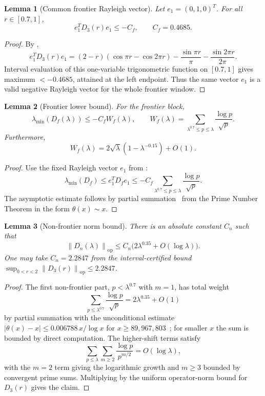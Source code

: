 \documentclass[11pt,a4paper]{article}
\newtheorem{lemma}[lemma]{Lemma}
\theoremstyle{remark}
\theoremstyle{plain}
\newcommand{\norm}[1]{\left\lVert #1 \right\rVert}
\begin{document}
\begin{lemma}[Common frontier Rayleigh vector]
\label{lem:common-vector}
Let $e_1=(0,1,0)^T$. For all $r\in[0.7,1]$,
\[
  e_1^T D_3(r)e_1\leq -C_f,
  \qquad C_f=0.4685.
\]
\end{lemma}

\begin{proof}
By ,
\[
  e_1^T D_3(r)e_1
  =(2-r)(\cos\pi r-\cos2\pi r)
  -\frac{\sin\pi r}{\pi}
  -\frac{\sin2\pi r}{2\pi}.
\]
Interval evaluation of this one-variable trigonometric function on $[0.7,1]$
gives maximum $<-0.4685$, attained at the left endpoint. Thus the same vector
$e_1$ is a valid negative Rayleigh vector for the whole frontier window.
\end{proof}

\begin{lemma}[Frontier lower bound]
\label{lem:frontier}
For the frontier block,
\[
  \lambda_{\min}(D_f(\lambda))
  \leq
  -C_f W_f(\lambda),
  \qquad
  W_f(\lambda)=
  \sum_{\lambda^{0.7}\leq p\leq\lambda}\frac{\log p}{\sqrt p}.
\]
Furthermore,
\[
  W_f(\lambda)=2\sqrt\lambda(1-\lambda^{-0.15})+O(1).
\]
\end{lemma}

\begin{proof}
Use the fixed Rayleigh vector $e_1$ from :
\[
  \lambda_{\min}(D_f)
  \leq e_1^T D_f e_1
  \leq -C_f\sum_{\lambda^{0.7}\leq p\leq\lambda}\frac{\log p}{\sqrt p}.
\]
The asymptotic estimate follows by partial summation~\cite{IwaniecKowalski2004}
from the Prime Number Theorem in the form $\theta(x)\sim x$.
\end{proof}

\begin{lemma}[Non-frontier norm bound]
\label{lem:nonfrontier}
There is an absolute constant $C_n$ such that
\[
  \norm{D_n(\lambda)}_{\mathrm{op}}
  \leq C_n\bigl(2\lambda^{0.35}+O(\log\lambda)\bigr).
\]
One may take $C_n=2.2847$ from the interval-certified bound
$\sup_{0<r<2}\norm{D_3(r)}_{\mathrm{op}}\leq2.2847$.
\end{lemma}

\begin{proof}
The first non-frontier part, $p<\lambda^{0.7}$ with $m=1$, has total weight
\[
  \sum_{p\leq\lambda^{0.7}}\frac{\log p}{\sqrt p}
  =2\lambda^{0.35}+O(1)
\]
by partial summation with the unconditional estimate
$|\theta(x)-x|\leq 0.006788\,x/\log x$ for $x\geq 89{,}967{,}803$~\cite{Dusart2010};
for smaller $x$ the sum is bounded by direct computation.
The higher-shift terms satisfy
\[
  \sum_{p\leq\lambda}\sum_{m\geq2}\frac{\log p}{p^{m/2}}
  =O(\log\lambda),
\]
with the $m=2$ term giving the logarithmic growth and $m\geq3$ bounded by
convergent prime sums. Multiplying by the uniform operator-norm bound for
$D_3(r)$ gives the claim.
\end{proof}
\end{document}
